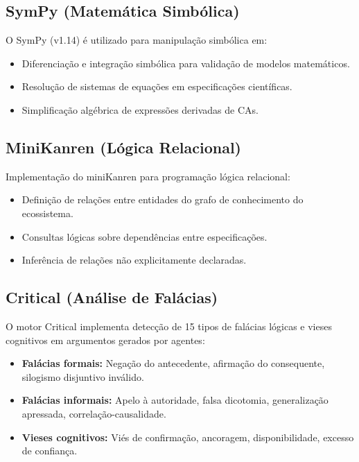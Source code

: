 \documentclass[
  brazil,
  sumario=tradicional,
  10pt
]{abntex2}
\begin{document}
\subsection{SymPy (Matemática Simbólica)}

O SymPy (v1.14) é utilizado para manipulação simbólica em:

\begin{itemize}
  \item Diferenciação e integração simbólica para validação de
    modelos matemáticos.
  \item Resolução de sistemas de equações em especificações
    científicas.
  \item Simplificação algébrica de expressões derivadas de CAs.
\end{itemize}

\subsection{MiniKanren (Lógica Relacional)}

Implementação do miniKanren para programação lógica relacional:

\begin{itemize}
  \item Definição de relações entre entidades do grafo de
    conhecimento do ecossistema.
  \item Consultas lógicas sobre dependências entre especificações.
  \item Inferência de relações não explicitamente declaradas.
\end{itemize}

\subsection{Critical (Análise de Falácias)}

O motor Critical implementa detecção de 15 tipos de falácias lógicas
e vieses cognitivos em argumentos gerados por agentes:

\begin{itemize}
  \item \textbf{Falácias formais:} Negação do antecedente, afirmação
    do consequente, silogismo disjuntivo inválido.
  \item \textbf{Falácias informais:} Apelo à autoridade, falsa
    dicotomia, generalização apressada, correlação-causalidade.
  \item \textbf{Vieses cognitivos:} Viés de confirmação, ancoragem,
    disponibilidade, excesso de confiança.
\end{itemize}
\end{document}
